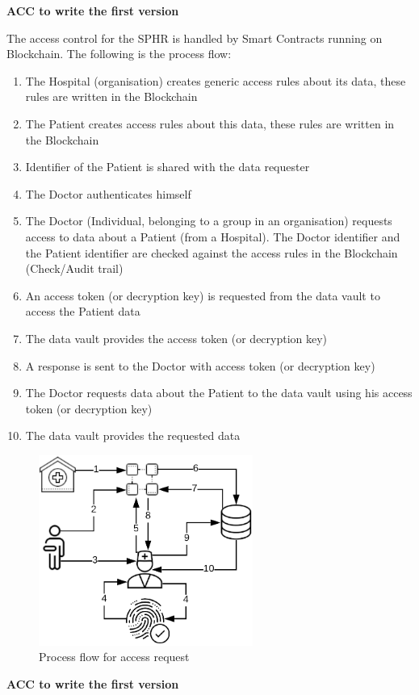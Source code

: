 \textbf{ACC to write the first version}


The access control for the SPHR is handled by Smart Contracts running on Blockchain. The following is the process flow:

\begin{enumerate}
    \item The Hospital (organisation) creates generic access rules about its data, these rules are written in the Blockchain
    \item The Patient creates access rules about this data, these rules are written in the Blockchain
    \item Identifier of the Patient is shared with the data requester
    \item The Doctor authenticates himself
    \item The Doctor (Individual, belonging to a group in an organisation) requests access to data about a Patient (from a Hospital). The Doctor identifier and the Patient identifier are checked against the access rules in the Blockchain (Check/Audit trail)
    \item An access token (or decryption key) is requested from the data vault to access the Patient data
    \item The data vault provides the access token (or decryption key)
    \item A response is sent to the Doctor with access token (or decryption key)
    \item The Doctor requests data about the Patient to the data vault using his access token (or decryption key)
    \item The data vault provides the requested data 
\end{enumerate}

\begin{figure}[H]
    \centering
    \includegraphics[width=70mm]{images/DataVault/blockchain.png}
    \caption{Process flow for access request}
    \label{fig:blockchain_flow}
\end{figure}



\textbf{ACC to write the first version}


